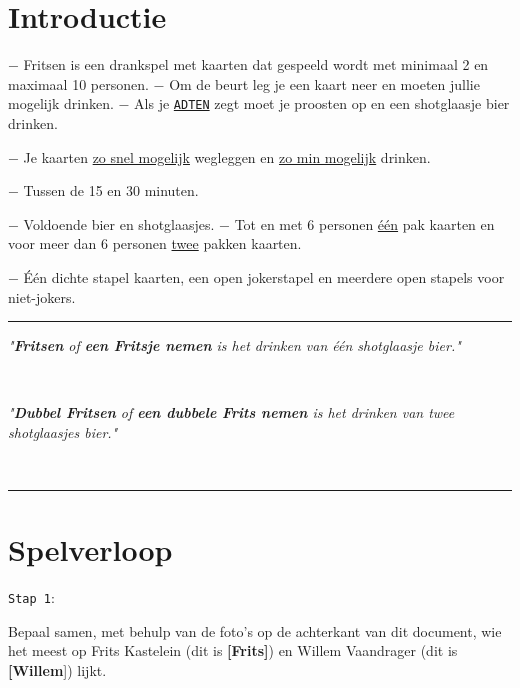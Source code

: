 \section*{Introductie}
$-$ Fritsen is een drankspel met kaarten dat gespeeld wordt met minimaal 2 en maximaal 10 personen. \newline $-$ Om de beurt leg je een kaart neer en moeten jullie mogelijk drinken. \newline $-$ Als je \ul{\texttt{ADTEN}} zegt moet je proosten op  en een shotglaasje bier drinken. 
\vspace*{-0.22cm} 

$-$ Je kaarten \ul{zo snel mogelijk} wegleggen en \ul{zo min mogelijk} drinken.  

\vspace*{-0.22cm} 

$-$ Tussen de 15 en 30 minuten.

\vspace*{-0.22cm} 

$-$ Voldoende bier en shotglaasjes. \newline $-$ Tot en met 6 personen \ul{\'e\'en} pak kaarten en voor meer dan 6 personen \ul{twee} pakken kaarten.

\vspace*{-0.22cm} 

$-$ \'E\'en dichte stapel kaarten, een open jokerstapel en meerdere open stapels voor niet-jokers.

\noindent\rule{\textwidth}{1pt}
\centerline{\textit{"\textbf{Fritsen} of \textbf{een Fritsje nemen} is het drinken van één shotglaasje bier."}} \\
\centerline{\textit{"\textbf{Dubbel Fritsen} of \textbf{een dubbele Frits nemen} is het drinken van twee shotglaasjes bier."}} \vspace*{-0.7cm}  \\
\noindent\rule{\textwidth}{1pt}

\vspace*{-0.45cm}

\section*{Spelverloop}
\label{sec:introductie}
\begin{minipage}[t]{.09\textwidth}
\texttt{Stap 1}:
\end{minipage}
\hfill
\begin{minipage}[t]{.91\textwidth}
Bepaal samen, met behulp van de foto's op de achterkant van dit document, wie het meest op Frits Kastelein (dit is \textbf{[Frits]}) en Willem Vaandrager (dit is \textbf{[Willem}]) lijkt. \\
\end{minipage}

